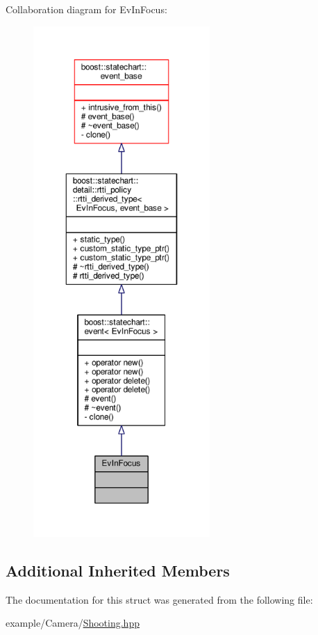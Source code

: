 Collaboration diagram for Ev\+In\+Focus\+:
\nopagebreak
\begin{figure}[H]
\begin{center}
\leavevmode
\includegraphics[height=550pt]{struct_ev_in_focus__coll__graph}
\end{center}
\end{figure}
\subsection*{Additional Inherited Members}


The documentation for this struct was generated from the following file\+:\begin{DoxyCompactItemize}
\item 
example/\+Camera/\mbox{\hyperlink{_shooting_8hpp}{Shooting.\+hpp}}\end{DoxyCompactItemize}
